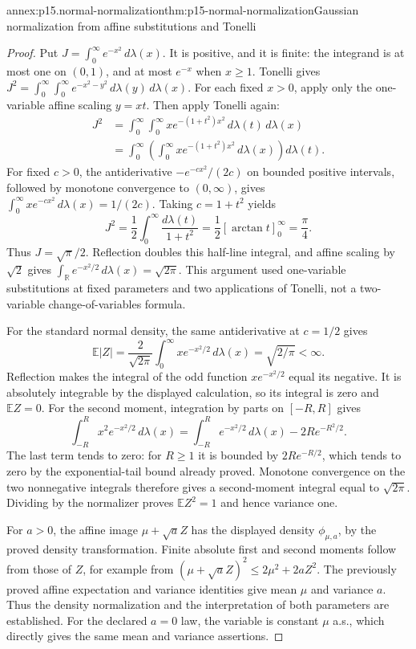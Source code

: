 \begin{annexitem}{annex:p15.normal-normalization}{thm:p15-normal-normalization}{Gaussian normalization from affine substitutions and Tonelli}
\begin{proof}
Put \(J=\int_0^\infty e^{-x^2}\,d\lambda(x)\).
It is positive, and it is finite: the integrand is at most one
on \((0,1)\), and at most \(e^{-x}\) when \(x\geq1\).
Tonelli gives
\(J^2=\int_0^\infty\int_0^\infty e^{-x^2-y^2}
\,d\lambda(y)\,d\lambda(x)\).
For each fixed \(x>0\), apply only the one-variable affine
scaling \(y=xt\). Then apply Tonelli again:
\[
 \begin{aligned}
 J^2
  &=\int_0^\infty\int_0^\infty
       x e^{-(1+t^2)x^2}\,d\lambda(t)\,d\lambda(x)\\
  &=\int_0^\infty\left(\int_0^\infty
       x e^{-(1+t^2)x^2}\,d\lambda(x)\right)d\lambda(t).
 \end{aligned}
\]
For fixed \(c>0\), the antiderivative
\(-e^{-cx^2}/(2c)\) on bounded positive intervals, followed
by monotone convergence to \((0,\infty)\), gives
\(\int_0^\infty x e^{-cx^2}\,d\lambda(x)=1/(2c)\).
Taking \(c=1+t^2\) yields
\[
 J^2=\frac12\int_0^\infty\frac{d\lambda(t)}{1+t^2}
     =\frac12[\arctan t]_0^\infty=\frac\pi4.
\]
Thus \(J=\sqrt\pi/2\). Reflection doubles this half-line
integral, and affine scaling by \(\sqrt2\) gives
\(\int_{\mathbb R}e^{-x^2/2}\,d\lambda(x)=\sqrt{2\pi}\).
This argument used one-variable substitutions at fixed parameters
and two applications of Tonelli, not a two-variable change-of-variables
formula.

For the standard normal density, the same antiderivative at
\(c=1/2\) gives
\[
 \mathbb E|Z|=\frac2{\sqrt{2\pi}}
                  \int_0^\infty x e^{-x^2/2}\,d\lambda(x)
             =\sqrt{2/\pi}<\infty.
\]
Reflection makes the integral of the odd function
\(x e^{-x^2/2}\) equal its negative. It is absolutely integrable
by the displayed calculation, so its integral is zero and
\(\mathbb E Z=0\).
For the second moment, integration by parts on \([-R,R]\)
gives
\[
 \int_{-R}^R x^2 e^{-x^2/2}\,d\lambda(x)
   =\int_{-R}^R e^{-x^2/2}\,d\lambda(x)-2R e^{-R^2/2}.
\]
The last term tends to zero: for \(R\geq1\) it is bounded
by \(2R e^{-R/2}\), which tends to zero by the exponential-tail
bound already proved. Monotone convergence on the two nonnegative
integrals therefore gives a second-moment integral equal to
\(\sqrt{2\pi}\). Dividing by the normalizer proves
\(\mathbb E Z^2=1\) and hence variance one.

For \(a>0\), the affine image \(\mu+\sqrt a Z\) has the
displayed density \(\phi_{\mu,a}\), by the proved density
transformation. Finite absolute first and second moments follow
from those of \(Z\), for example from
\((\mu+\sqrt a Z)^2\leq2\mu^2+2aZ^2\).
The previously proved affine expectation and variance identities
give mean \(\mu\) and variance \(a\). Thus the density
normalization and the interpretation of both parameters are established.
For the declared \(a=0\) law, the variable is constant \(\mu\)
a.s., which directly gives the same mean and variance assertions.
\end{proof}
\end{annexitem}

